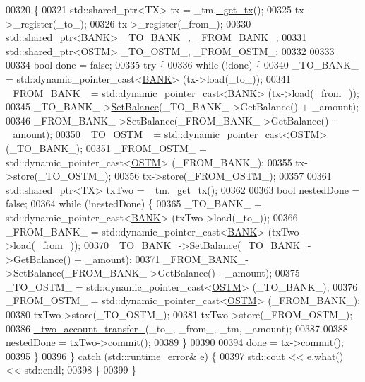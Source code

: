 \begin{DoxyCode}
00320                                                                                                         \{
00321     std::shared\_ptr<TX> tx = \_tm.\hyperlink{class_t_m_a41cb0226cc4080c931651b13f74a0075_a41cb0226cc4080c931651b13f74a0075}{\_get\_tx}();
00325     tx->\_register(\_to\_);
00326     tx->\_register(\_from\_);
00330     std::shared\_ptr<BANK> \_TO\_BANK\_, \_FROM\_BANK\_;
00331     std::shared\_ptr<OSTM> \_TO\_OSTM\_, \_FROM\_OSTM\_;
00332 
00333 
00334     \textcolor{keywordtype}{bool} done = \textcolor{keyword}{false};
00335     \textcolor{keywordflow}{try} \{
00336         \textcolor{keywordflow}{while} (!done) \{
00340             \_TO\_BANK\_ = std::dynamic\_pointer\_cast<\hyperlink{class_b_a_n_k}{BANK}> (tx->load(\_to\_));
00341             \_FROM\_BANK\_ = std::dynamic\_pointer\_cast<\hyperlink{class_b_a_n_k}{BANK}> (tx->load(\_from\_));
00345             \_TO\_BANK\_->\hyperlink{class_b_a_n_k_ae3e45b407bf8ec7175662442ea24b7c0_ae3e45b407bf8ec7175662442ea24b7c0}{SetBalance}(\_TO\_BANK\_->GetBalance() + \_amount);
00346             \_FROM\_BANK\_->SetBalance(\_FROM\_BANK\_->GetBalance() - \_amount);
00350             \_TO\_OSTM\_ = std::dynamic\_pointer\_cast<\hyperlink{class_o_s_t_m}{OSTM}> (\_TO\_BANK\_);
00351             \_FROM\_OSTM\_ = std::dynamic\_pointer\_cast<\hyperlink{class_o_s_t_m}{OSTM}> (\_FROM\_BANK\_);
00355             tx->store(\_TO\_OSTM\_);
00356             tx->store(\_FROM\_OSTM\_);
00357 
00361             std::shared\_ptr<TX> txTwo = \_tm.\hyperlink{class_t_m_a41cb0226cc4080c931651b13f74a0075_a41cb0226cc4080c931651b13f74a0075}{\_get\_tx}();
00362 
00363             \textcolor{keywordtype}{bool} nestedDone = \textcolor{keyword}{false};
00364             \textcolor{keywordflow}{while} (!nestedDone) \{
00365                 \_TO\_BANK\_ = std::dynamic\_pointer\_cast<\hyperlink{class_b_a_n_k}{BANK}> (txTwo->load(\_to\_));
00366                 \_FROM\_BANK\_ = std::dynamic\_pointer\_cast<\hyperlink{class_b_a_n_k}{BANK}> (txTwo->load(\_from\_));
00370                 \_TO\_BANK\_->\hyperlink{class_b_a_n_k_ae3e45b407bf8ec7175662442ea24b7c0_ae3e45b407bf8ec7175662442ea24b7c0}{SetBalance}(\_TO\_BANK\_->GetBalance() + \_amount);
00371                 \_FROM\_BANK\_->SetBalance(\_FROM\_BANK\_->GetBalance() - \_amount);
00375                 \_TO\_OSTM\_ = std::dynamic\_pointer\_cast<\hyperlink{class_o_s_t_m}{OSTM}> (\_TO\_BANK\_);
00376                 \_FROM\_OSTM\_ = std::dynamic\_pointer\_cast<\hyperlink{class_o_s_t_m}{OSTM}> (\_FROM\_BANK\_);
00380                 txTwo->store(\_TO\_OSTM\_);
00381                 txTwo->store(\_FROM\_OSTM\_);
00386                 \hyperlink{class_my_test_c_ase_af0cc86421d281cc4a583a394ae86dbdd_af0cc86421d281cc4a583a394ae86dbdd}{\_two\_account\_transfer\_}(\_to\_, \_from\_, \_tm, \_amount);
00387 
00388                 nestedDone = txTwo->commit();
00389             \}
00390 
00394             done = tx->commit();
00395         \}
00396     \} \textcolor{keywordflow}{catch} (std::runtime\_error& e) \{
00397         std::cout << e.what() << std::endl;
00398     \}
00399 \}
\end{DoxyCode}


